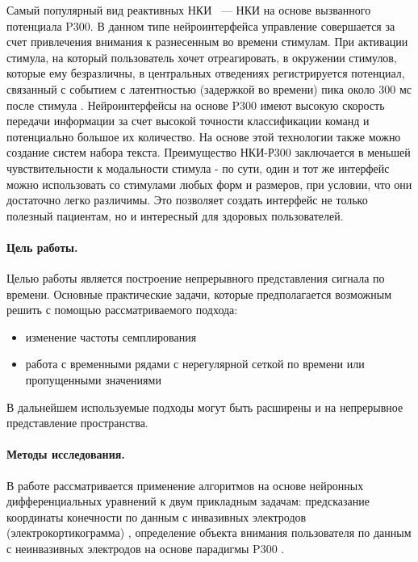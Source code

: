 \documentclass[12pt]{article}
\begin{document}
Самый популярный вид реактивных НКИ ~--- НКИ на основе вызванного потенциала P300. В данном типе нейроинтерфейса управление совершается за счет привлечения внимания к разнесенным во времени стимулам. При активации стимула, на который пользователь хочет отреагировать, в окружении стимулов, которые ему безразличны, в центральных отведениях регистрируется потенциал, связанный с событием с латентностью (задержкой во времени) пика около 300 мс после стимула \cite{polich2007updating}. Нейроинтерфейсы на основе P300 имеют высокую скорость передачи информации за счет высокой точности классификации команд и потенциально большое их количество. На основе этой технологии также можно создание систем набора текста. Преимущество НКИ-Р300 заключается в меньшей чувствительности к модальности стимула - по сути, один и тот же интерфейс можно использовать со стимулами любых форм и размеров, при условии, что они достаточно легко различимы. Это позволяет создать интерфейс не только полезный пациентам, но и интересный для здоровых пользователей. 
    








\paragraph{Цель работы.}

Целью работы является построение непрерывного представления сигнала по времени. Основные практические задачи, которые предполагается возможным решить с помощью рассматриваемого подхода:
\begin{itemize}
    \item изменение частоты семплирования
    \item работа с временными рядами с нерегулярной сеткой по времени или пропущенными значениями
\end{itemize}


В дальнейшем используемые подходы могут быть расширены и на непрерывное представление пространства.


\paragraph{Методы исследования.}



В работе рассматривается применение алгоритмов на основе нейронных дифференциальных уравнений к двум прикладным задачам: предсказание координаты конечности по данным с инвазивных электродов (электрокортикограмма) \cite{neurotycho}, определение объекта внимания пользователя по данным с неинвазивных электродов на основе парадигмы P300 \cite{sth about P300}.
\end{document}
